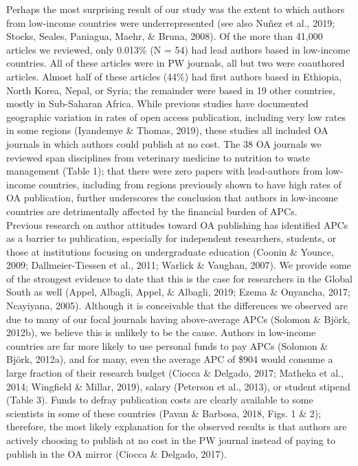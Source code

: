 \documentclass[english,man]{apa6}
\begin{document}
Perhaps the most surprising result of our study was the extent to which authors from low-income countries were underrepresented (see also Nuñez et al., 2019; Stocks, Seales, Paniagua, Maehr, \& Bruna, 2008). Of the more than 41,000 articles we reviewed, only 0.013\% (N = 54) had lead authors based in low-income countries. All of these articles were in PW journals, all but two were coauthored articles. Almost half of these articles (44\%) had first authors based in Ethiopia, North Korea, Nepal, or Syria; the remainder were based in 19 other countries, mostly in Sub-Saharan Africa. While previous studies have documented geographic variation in rates of open access publication, including very low rates in some regions (Iyandemye \& Thomas, 2019), these studies all included OA journals in which authors could publish at no cost. The 38 OA journals we reviewed span disciplines from veterinary medicine to nutrition to waste management (Table 1); that there were zero papers with lead-authors from low-income countries, including from regions previously shown to have high rates of OA publication, further underscores the conclusion that authors in low-income countries are detrimentally affected by the financial burden of APCs.\\
Previous research on author attitudes toward OA publishing has identified APCs as a barrier to publication, especially for independent researchers, students, or those at institutions focusing on undergraduate education (Coonin \& Younce, 2009; Dallmeier-Tiessen et al., 2011; Warlick \& Vaughan, 2007). We provide some of the strongest evidence to date that this is the case for researchers in the Global South as well (Appel, Albagli, Appel, \& Albagli, 2019; Ezema \& Onyancha, 2017; Ncayiyana, 2005). Although it is conceivable that the differences we observed are due to many of our focal journals having above-average APCs (Solomon \& Björk, 2012b), we believe this is unlikely to be the cause. Authors in low-income countries are far more likely to use personal funds to pay APCs (Solomon \& Björk, 2012a), and for many, even the average APC of \$904 would consume a large fraction of their research budget (Ciocca \& Delgado, 2017; Matheka et al., 2014; Wingfield \& Millar, 2019), salary (Peterson et al., 2013), or student stipend (Table 3). Funds to defray publication costs are clearly available to some scientists in some of these countries (Pavan \& Barbosa, 2018, Figs. 1 \& 2); therefore, the most likely explanation for the observed results is that authors are actively choosing to publish at no cost in the PW journal instead of paying to publish in the OA mirror (Ciocca \& Delgado, 2017).\\
\end{document}
